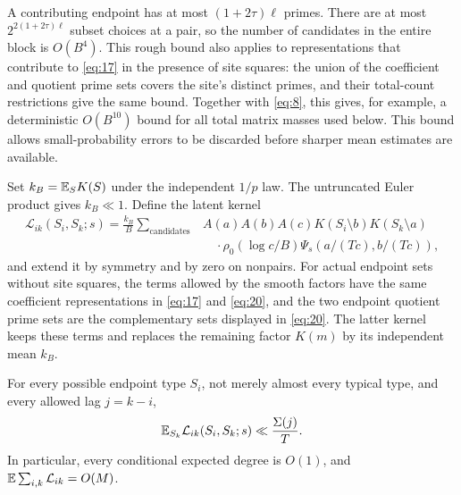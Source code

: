 A contributing endpoint has at most $(1+2\tau)\ell$ primes.
There are at most $2^{2(1+2\tau)\ell}$ subset choices at a pair,
so the number of candidates in the entire block is $O(B^4)$.
This rough bound also applies to representations that contribute to
\eqref{eq:17} in the presence of site squares: the union of the
coefficient and quotient prime sets covers the site's distinct
primes, and their total-count restrictions give the same bound.
Together with \eqref{eq:8}, this gives, for example, a deterministic
$O(B^{10})$ bound for all total matrix masses used below. This bound
allows small-probability errors to be discarded before sharper mean
estimates are available.

Set $k_B=\mathbb E_S K(S)$ under the independent $1/p$ law. The
untruncated Euler product gives $k_B\ll1$. Define the latent kernel
\begin{equation}\label{eq:20}
\begin{split}
 \mathcal L_{ik}(S_i,S_k;s)=\frac{k_B}{B}
 \sum_{\text{candidates}}&A(a)A(b)A(c)
 K(S_i\setminus b)K(S_k\setminus a)\\[-2pt]
 &\quad\cdot\rho_0(\log c/B)\Psi_s(a/(Tc),b/(Tc)),
\end{split}
\end{equation}
and extend it by symmetry and by zero on nonpairs.
For actual endpoint sets without site squares, the terms allowed by the
smooth factors have the same coefficient representations in
\eqref{eq:17} and \eqref{eq:20}, and the two endpoint quotient prime sets
are the complementary sets displayed in \eqref{eq:20}. The latter kernel
keeps these terms and replaces the remaining factor $K(m)$ by its
independent mean $k_B$.

\begin{lemma}\label{lem:graph-row-mean}
For every possible endpoint type $S_i$, not merely almost every
typical type, and every allowed lag $j=k-i$,
\begin{equation}\label{eq:23}
 \mathbb E_{S_k}\mathcal L_{ik}(S_i,S_k;s)
 \ll\frac{\Sigma(j)}T.
\end{equation}
In particular, every conditional expected degree is $O(1)$, and
$\mathbb E\sum_{i,k}\mathcal L_{ik}=O(M)$.
\end{lemma}

